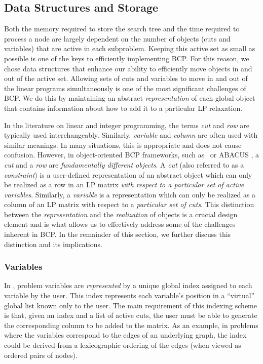 \subsection{Data Structures and Storage}
\label{data-structures}

Both the memory required to store the search tree and the time
required to process a node are largely dependent on the number of
objects (cuts and variables) that are active in each subproblem.
Keeping this active set as small as possible is one of the keys to
efficiently implementing BCP. For this reason, we chose data
structures that enhance our ability to efficiently move objects in and
out of the active set. Allowing sets of cuts and variables to move in
and out of the linear programs simultaneously is one of the most
significant challenges of BCP. We do this by maintaining an abstract
{\em representation} of each global object that contains information
about how to add it to a particular LP relaxation. 

In the literature on linear and integer programming, the terms {\em
cut} and {\em row} are typically used interchangeably. Similarly, {\em
variable} and {\em column} are often used with similar meanings. In
many situations, this is appropriate and does not cause confusion.
However, in object-oriented BCP frameworks, such as \BB\ or ABACUS
\cite{abacus1}, a {\em cut} and a {\em row} are {\em fundamentally
different objects}. A {\em cut} (also referred to as a {\em
constraint}) is a user-defined representation of an abstract object
which can only be realized as a row in an LP matrix {\em with respect
to a particular set of active variables}. Similarly, a {\em variable}
is a representation which can only be realized as a column of an LP
matrix with respect to a {\em particular set of cuts}. This
distinction between the {\em representation} and the {\em realization}
of objects is a crucial design element and is what allows us to
effectively address some of the challenges inherent in BCP. In the
remainder of this section, we further discuss this distinction
and its implications.


\subsubsection{Variables}
\label{variables}

In \BB, problem variables are {\em represented} by a unique global
index assigned to each variable by the user. This index represents
each variable's position in a ``virtual'' global list known only to
the user. The main requirement of this indexing scheme is that, given
an index and a list of active cuts, the user must be able to generate
the corresponding column to be added to the matrix. As an example, in
problems where the variables correspond to the edges of an underlying
graph, the index could be derived from a lexicographic ordering of the
edges (when viewed as ordered pairs of nodes).

